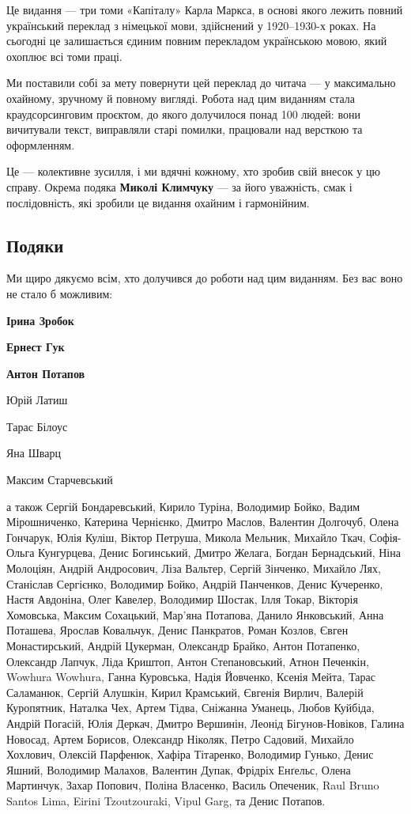 

Це видання — три томи «Капіталу» Карла Маркса, в основі якого лежить повний
український переклад з німецької мови, здійснений у 1920–1930-х роках.
На сьогодні це залишається єдиним повним перекладом українською мовою, який охоплює всі томи праці.

Ми поставили собі за мету повернути цей переклад до читача — у максимально охайному, зручному й повному вигляді.
Робота над цим виданням стала краудсорсинговим проєктом, до якого долучилося понад 100 людей: вони вичитували текст, виправляли старі помилки, працювали над версткою та оформленням.

Це — колективне зусилля, і ми вдячні кожному, хто зробив свій внесок у цю справу.
Окрема подяка \textbf{Миколі Климчуку} — за його уважність, смак і послідовність, які зробили це видання охайним і гармонійним.

\subsection*{Подяки}

Ми щиро дякуємо всім, хто долучився до роботи над цим виданням. Без вас воно не стало б можливим:

\begin{center}
\textbf{Ірина Зробок}

\textbf{Ернест Гук}

\textbf{Антон Потапов}

Юрій Латиш

Тарас Білоус

Яна Шварц

Максим Старчевський

\end{center}

\noindent{}а також
Сергій Бондаревський,
Кирило Туріна,
Володимир Бойко,
Вадим Мірошниченко,
Катерина Чернієнко,
Дмитро Маслов,
Валентин Долгочуб,
Олена Гончарук,
Юлія Куліш,
Віктор Петруша,
Микола Мельник,
Михайло Ткач,
Софія-Ольга Кунгурцева,
Денис Богинський,
Дмитро Желага,
Богдан Бернадський,
Ніна Молоціян,
Андрій Андросович,
Ліза Вальтер,
Сергій Зінченко,
Михайло Лях,
Станіслав Сергієнко,
Володимир Бойко,
Андрій Панченков,
Денис Кучеренко,
Настя Авдоніна,
Олег Кавелер,
Володимир Шостак,
Ілля Токар,
Вікторія Хомовська,
Максим Сохацький,
Мар'яна Потапова,
Данило Янковський,
Анна Поташева,
Ярослав Ковальчук,
Денис Панкратов,
Роман Козлов,
Євген Монастирський,
Андрій Цукерман,
Олександр Брайко,
Антон Потапенко,
Олександр Лапчук,
Ліда Криштоп,
Антон Степановський,
Атнон Печенкін,
Wowhura Wowhura,
Ганна Куровська,
Надія Йовченко,
Ксенія Мейта,
Тарас Саламанюк,
Сергій Алушкін,
Кирил Крамський,
Євгенія Вирлич,
Валерій Куропятник,
Наталка Чех,
Артем Тідва,
Сніжанна Уманець,
Любов Куйбіда,
Андрій Погасій,
Юлія Деркач,
Дмитро Вершинін,
Леонід Бігунов-Новіков,
Галина Новосад,
Артем Борисов,
Олександр Ніколяк,
Петро Садовий,
Михайло Хохлович,
Олексій Парфенюк,
Хафіра Тітаренко,
Володимир Гунько,
Денис Яшний,
Володимир Малахов,
Валентин Дупак,
Фрідріх Енґельс,
Олена Мартинчук,
Захар Попович,
Поліна Власенко,
Василь Опеченик,
Raul Bruno Santos Lima,
Eirini Tzoutzouraki,
Vipul Garg,
та Денис Потапов.

\cleardoublepage
